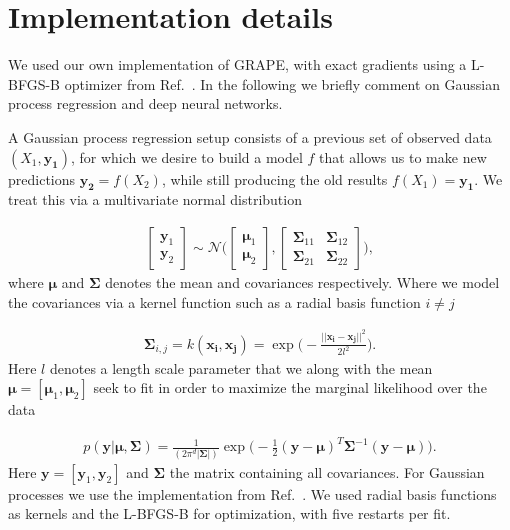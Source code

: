 \documentclass[aps, twocolumn,superscriptaddress]{revtex4-1}
\begin{document}
\appendix
\section{Implementation details} \label{sec:Implementation_details}
We used our own implementation of GRAPE, with exact gradients using a L-BFGS-B optimizer from Ref.~\cite{2020SciPy-NMeth}. In the following we briefly comment on Gaussian process regression and deep neural networks. 


A Gaussian process regression setup \cite{rasmussen2003gaussian} consists of a previous set of observed data $(X_1, \mathbf{y_1})$, for which we desire to build a model $f$ that allows us to make new predictions $\mathbf{y_2} = f(X_2)$, while still producing the old results $f(X_1) = \mathbf{y_1}$. We treat this via a multivariate normal distribution

\begin{align}
    \begin{bmatrix}
    \mathbf{y}_1\\
    \mathbf{y}_2
    \end{bmatrix}
    \sim
    \mathcal{N}
    \Bigg(
    \begin{bmatrix}
    \boldsymbol{\mu}_1\\
    \boldsymbol{\mu}_2
    \end{bmatrix}
    ,
    \begin{bmatrix}
    \boldsymbol{\Sigma}_{11} & \boldsymbol{\Sigma}_{12}\\
    \boldsymbol{\Sigma}_{21} & \boldsymbol{\Sigma}_{22}
    \end{bmatrix}
    \Bigg),
\end{align}
where $\boldsymbol{\mu}$ and $\boldsymbol{\Sigma}$ denotes the mean and covariances respectively. Where we model the covariances via a kernel function such as a radial basis function $i\neq j$

\begin{align}
    \boldsymbol{\Sigma}_{i,j}
    = k(\mathbf{x_i},\mathbf{x_j}) = \exp \bigg( -\frac{||\mathbf{x_i}-\mathbf{x_j}||^2}{2l^2} \bigg).
\end{align}
Here $l$ denotes a length scale parameter that we along with the mean $\boldsymbol{\mu} = [\boldsymbol{\mu}_1, \boldsymbol{\mu}_2]$ seek to fit in order to maximize the marginal likelihood over the data

\begin{align}
    p(\mathbf{y}|\boldsymbol{\mu}, \boldsymbol{\Sigma})
    = \frac{1}{(2\pi^d |\boldsymbol{\Sigma}|)}
    \exp
    \bigg(
    - \frac{1}{2}
    (\mathbf{y}-\boldsymbol{\mu})^T
    \boldsymbol{\Sigma}^{-1}
    (\mathbf{y}-\boldsymbol{\mu})
    \bigg).
\end{align}
Here $\mathbf{y} = [\mathbf{y}_1, \mathbf{y}_2]$ and $\boldsymbol{\Sigma}$ the matrix containing all covariances. For Gaussian processes we use the implementation from Ref.~\cite{scikit-learn}. We used radial basis functions as kernels and the L-BFGS-B for optimization, with five restarts per fit. 
\end{document}
